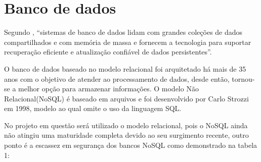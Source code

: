 


\section{Banco de dados}
\label{sec:opencv}

Segundo \cite{ceri2013logic}, “sistemas de banco de dados lidam com grandes coleções de dados compartilhados e com memória de massa e fornecem a tecnologia para suportar recuperação eficiente e atualização confiável de dados persistentes”. \par
O banco de dados baseado no modelo relacional foi arquitetado há mais de 35 anos com o objetivo de atender ao processamento de dados, desde então, tornou-se a melhor opção para armazenar informações. O modelo Não Relacional(NoSQL) é baseado em arquivos e foi desenvolvido por Carlo Strozzi em 1998, modelo ao qual omite o uso da linguagem SQL.\cite{mohamed2014relationalvsnosql} \par
No projeto em questão será utilizado o modelo relacional, pois o NoSQL ainda não atingiu uma maturidade completa devido ao seu surgimento recente, outro ponto é a escassez em segurança dos bancos NoSQL como demonstrado na tabela 1\cite{mohamed2014relationalvsnosql}: \par

